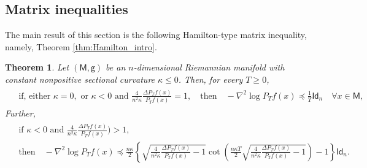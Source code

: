 \documentclass[a4paper,twoside,11pt,reqno]{amsart}
\newtheorem{theorem}{Theorem}
\newcommand{\MM}{\mathsf{M}}
\newcommand{\GG}{\mathsf{g}}
\newcommand{\msf}{\mathsf}
\begin{document}
\subsection{Matrix inequalities}
\label{subsec:matrix_inq}
The main result of this section is the following Hamilton-type matrix inequality, namely, Theorem \ref{thm:Hamilton_intro}.
\begin{theorem}
\label{thm:Hamilton}
Let $(\MM,\GG)$ be an $n$-dimensional Riemannian manifold with constant nonpositive sectional curvature $\kappa \le 0$. Then, for every $T\ge 0$, 
\begin{align}
\label{eq:Hamilton_matrix_inq_negcurved_lambda=0}
\begin{split}
&\text{if, either }\kappa=0, \text{ or }\kappa<0\text{ and }\frac{4}{n^2\kappa}\frac{\Delta P_Tf(x)}{P_Tf(x)}=1,\quad\text{then}\quad -\nabla^2\log P_Tf(x)	\preceq   \frac{1}{T}\msf{Id}_n\quad\forall x\in \MM ,
\end{split}
\end{align}
Further,
\begin{align}
\label{eq:Hamilton_matrix_inq_negcurved_lambda>0}
\begin{split}
&\text{if }\kappa<0\text{ and }\frac{4}{n^2\kappa}\frac{\Delta P_Tf(x)}{P_Tf(x)})>1,\\
&\text{then}\quad 
-\nabla^2\log P_Tf(x)	\preceq \frac{n\kappa}{2}\left\{\sqrt{\frac{4}{n^2\kappa}\frac{\Delta P_Tf(x)}{P_Tf(x)}-1}\cot\left(\frac{n\kappa T}{2}\sqrt{\frac{4}{n^2\kappa}\frac{\Delta P_Tf(x)}{P_Tf(x)}-1}\right)-1\right\}\msf{Id}_n.
\end{split}
\end{align}
\end{theorem}
\end{document}
